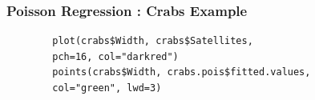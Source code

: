 \documentclass[MASTER.tex]{subfiles}
\begin{document}
\begin{frame}[fragile]
	\frametitle{Poisson Regression :  Crabs Example}
	
	\begin{framed}
		\begin{verbatim}
		plot(crabs$Width, crabs$Satellites,
		pch=16, col="darkred")
		points(crabs$Width, crabs.pois$fitted.values, 
		col="green", lwd=3)
		\end{verbatim}
	\end{framed}
\end{frame}
\end{document}
